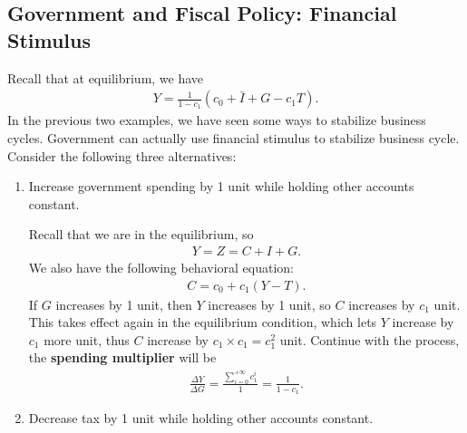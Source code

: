 \documentclass[12pt]{article}
\begin{document}
\subsection*{Government and Fiscal Policy: Financial Stimulus}
Recall that at equilibrium, we have
\begin{align*}
    Y = \frac{1}{1-c_1}(c_0 + \bar{I} + G - c_1T).
\end{align*}
In the previous two examples, we have seen some ways to stabilize business cycles. Government can actually use financial stimulus to stabilize business cycle. Consider the following three alternatives:
\begin{enumerate}[label=(\arabic*)]
    \item Increase government spending by 1 unit while holding other accounts constant.
    
    Recall that we are in the equilibrium, so
    \begin{align*}
        Y = Z = C + I + G.
    \end{align*}
    We also have the following behavioral equation:
    \begin{align*}
        C = c_0 + c_1(Y-T).
    \end{align*}
    If $G$ increases by 1 unit, then $Y$ increases by 1 unit, so $C$ increases by $c_1$ unit. This takes effect again in the equilibrium condition, which lets $Y$ increase by $c_1$ more unit, thus $C$ increase by $c_1 \times c_1 = c_1^2$ unit. Continue with the process, the \textbf{spending multiplier} will be
    \begin{align*}
        \frac{\Delta Y}{\Delta G} = \frac{\sum_{i=0}^{+\infty}c_1^i}{1} = \frac{1}{1-c_1}.
    \end{align*}
    \item Decrease tax by 1 unit while holding other accounts constant.
\end{enumerate}
\end{document}
